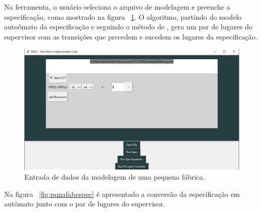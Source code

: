 Na ferramenta, o usu\'ario seleciona o arquivo de modelagem e preenche a especifica\c{c}\~ao, como mostrado na figura ~\ref{fig:pqnafabentrada}. O algoritmo, partindo do modelo auto\^omato da especifica\c{c}\~ao e seguindo o m\'etodo de \cite{UzamWonham2005}, gera um par de lugares do supervisor com as transi\c{c}\~oes que precedem e sucedem os lugares da especifica\c{c}\~ao.

\begin{figure}[!htb]
	\caption[Entrada de dados da modelagem de uma pequena f\'abrica.]{Entrada de dados da modelagem de uma pequena f\'abrica.}
	\label{fig:pqnafabentrada}
	\includegraphics[width=16cm]{./figuras/PQNAFABENTRADA.png}\centering
\end{figure}

Na figura ~\ref{fig:pqnafabespec} \'e apresentado a convers\~ao da especifica\c{c}\~ao em aut\^omato junto com o par de lugares do supervisor. 

